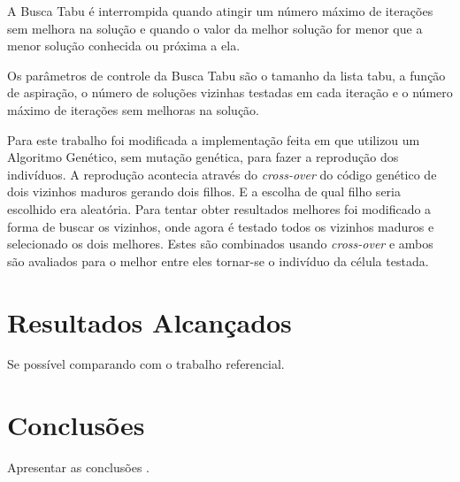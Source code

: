 \documentclass[12pt]{article}
\begin{document}
A Busca Tabu é interrompida quando atingir um número máximo de iterações sem
melhora na solução e quando o valor da melhor solução for menor que a menor
solução conhecida ou próxima a ela.

Os parâmetros de controle da Busca Tabu são o tamanho da lista tabu, a função
de aspiração, o número de soluções vizinhas testadas em cada iteração e o
número máximo de iterações sem melhoras na solução.

Para este trabalho foi modificada a implementação feita em \cite{dzwinel:04}
que utilizou um Algoritmo Genético, sem mutação genética, para fazer a 
reprodução dos indivíduos. A reprodução acontecia através do
\textit{cross-over} do código genético de dois vizinhos maduros gerando dois
filhos. E a escolha de qual filho seria escolhido era aleatória. Para
tentar obter resultados melhores foi modificado a forma de buscar os vizinhos,
onde agora é testado todos os vizinhos maduros e selecionado os dois melhores.
Estes são combinados usando \textit{cross-over} e ambos são avaliados para
o melhor entre eles tornar-se o indivíduo da célula testada. 


\section{Resultados Alcançados}

Se possível comparando com o trabalho referencial.

\section{Conclusões}

Apresentar as conclusões  \cite{dzwinel:04}.





\end{document}
